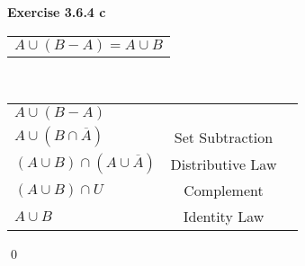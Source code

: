\documentclass[11pt]{article}
\begin{document}
\noindent \textbf{Exercise 3.6.4 c }\\
\begin{center}
  \begin{tabular}{l}
  $A \cup (B - A) = A \cup B$\\
  
  \end{tabular} \\
 \begin{center}
  \begin{tabular}{lcl}
  
 $A \cup (B - A) $& \\
$A \cup (B \cap \overline{A})$ & Set Subtraction\\
$(A \cup B) \cap (A \cup \overline{A})$ & Distributive Law\\
$(A \cup B) \cap U $ & Complement\\
$A \cup B $ & Identity Law\\ 

  \end{tabular}
\end{center}
\end{center}
\qed 
\end{document}
